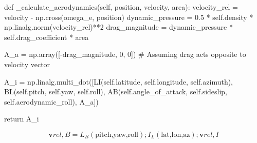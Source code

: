     def _calculate_aerodynamics(self, position, velocity, area):
        velocity_rel = velocity - np.cross(omega_e, position)
        dynamic_pressure = 0.5 * self.density * np.linalg.norm(velocity_rel)**2
        drag_magnitude = dynamic_pressure * self.drag_coefficient * area

        A_a = np.array([-drag_magnitude, 0, 0])  # Assuming drag acts opposite to velocity vector

        A_i = np.linalg.multi_dot([LI(self.latitude, self.longitude, self.azimuth),
                                   BL(self.pitch, self.yaw, self.roll),
                                   AB(self.angle_of_attack, self.sideslip, self.aerodynamic_roll), 
                                   A_a])

        return A_i


\begin{equation}
    \mathbf{v}{rel,B}=L_B(\text{pitch,yaw,roll});I_L(\text{lat,lon,az});\mathbf{v}{rel,I}
\end{equation}
